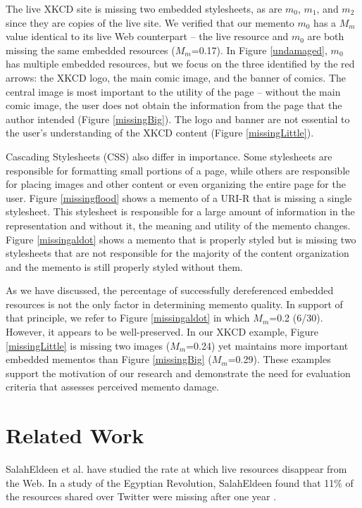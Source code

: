 The live XKCD site is missing two embedded stylesheets, as are $m_0$, $m_1$, and $m_2$ since they are copies of the live site. We verified that our memento $m_0$ has a $M_m$ value identical to its live Web counterpart -- the live resource and $m_0$ are both missing the same embedded resources ($M_m$=0.17). In Figure \ref{undamaged}, $m_0$ has multiple embedded resources, but we focus on the three identified by the red arrows: the XKCD logo, the main comic image, and the banner of comics. The central image is most important to the utility of the page -- without the main comic image, the user does not obtain the information from the page that the author intended (Figure \ref{missingBig}). The logo and banner are not essential to the user's understanding of the XKCD content (Figure \ref{missingLittle}). 

Cascading Stylesheets (CSS) also differ in importance. Some stylesheets are responsible for formatting small portions of a page, while others are responsible for placing images and other content or even organizing the entire page for the user. Figure \ref{missingflood} shows a memento of a URI-R that is missing a single stylesheet. This stylesheet is responsible for a large amount of information in the representation and without it, the meaning and utility of the memento changes. Figure \ref{missingaldot} shows a memento that is properly styled but is missing two stylesheets that are not responsible for the majority of the content organization and the memento is still properly styled without them.

As we have discussed, the percentage of successfully dereferenced embedded resources is not the only factor in determining memento quality. In support of that principle, we refer to Figure \ref{missingaldot} in which $M_m$=0.2 (6/30). However, it appears to be well-preserved. In our XKCD example, Figure \ref{missingLittle} is missing two images ($M_m$=0.24) yet maintains more important embedded mementos than Figure \ref{missingBig} ($M_m$=0.29). These examples support the motivation of our research and demonstrate the need for evaluation criteria that assesses perceived memento damage.


\section{Related Work}
\label{priorwork}

SalahEldeen et al. have studied the rate at which live resources disappear from the Web. In a study of the Egyptian Revolution, SalahEldeen found that 11\% of the resources shared over Twitter were missing after one year \cite{losingmyrevolution, hanyTPDL2013}. %

